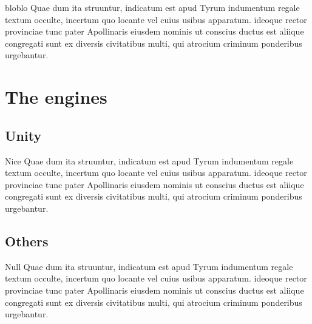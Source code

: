 \documentclass[a4paper,10pt]{beamer}
\begin{document}
			\begin{frame}{bloblo}
				Quae dum ita struuntur, indicatum est apud Tyrum indumentum regale textum occulte, incertum quo locante vel cuius usibus apparatum. ideoque rector provinciae tunc pater Apollinaris eiusdem nominis ut conscius ductus est aliique congregati sunt ex diversis civitatibus multi, qui atrocium criminum ponderibus urgebantur.
			\end{frame}
	
	\section{The engines}
	
		\subsection{Unity}
		
			\begin{frame}{Nice}
				Quae dum ita struuntur, indicatum est apud Tyrum indumentum regale textum occulte, incertum quo locante vel cuius usibus apparatum. ideoque rector provinciae tunc pater Apollinaris eiusdem nominis ut conscius ductus est aliique congregati sunt ex diversis civitatibus multi, qui atrocium criminum ponderibus urgebantur.
			\end{frame}
			
		\subsection{Others}
			
			\begin{frame}{Null}
				Quae dum ita struuntur, indicatum est apud Tyrum indumentum regale textum occulte, incertum quo locante vel cuius usibus apparatum. ideoque rector provinciae tunc pater Apollinaris eiusdem nominis ut conscius ductus est aliique congregati sunt ex diversis civitatibus multi, qui atrocium criminum ponderibus urgebantur.
			\end{frame}
	
\end{document}
